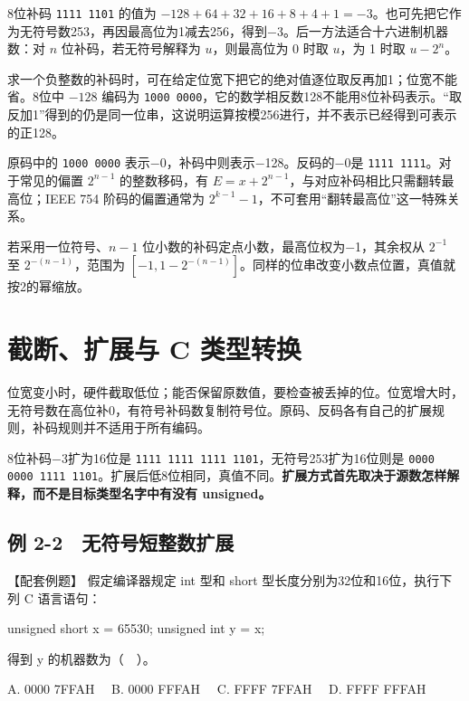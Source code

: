 8位补码 \texttt{1111 1101} 的值为 \(-128+64+32+16+8+4+1=-3\)。也可先把它作为无符号数253，再因最高位为1减去256，得到\ensuremath{-}3。后一方法适合十六进制机器数：对 \(n\) 位补码，若无符号解释为 \(u\)，则最高位为 0 时取 \(u\)，为 1 时取 \(u-2^n\)。

求一个负整数的补码时，可在给定位宽下把它的绝对值逐位取反再加1；位宽不能省。8位中 \(-128\) 编码为 \texttt{1000 0000}，它的数学相反数128不能用8位补码表示。``取反加1''得到的仍是同一位串，这说明运算按模256进行，并不表示已经得到可表示的正128。

原码中的 \texttt{1000 0000} 表示\ensuremath{-}0，补码中则表示\ensuremath{-}128。反码的\ensuremath{-}0是 \texttt{1111 1111}。对于常见的偏置 \(2^{n-1}\) 的整数移码，有 \(E=x+2^{n-1}\)，与对应补码相比只需翻转最高位；IEEE 754 阶码的偏置通常为 \(2^{k-1}-1\)，不可套用``翻转最高位''这一特殊关系。

若采用一位符号、\(n-1\) 位小数的补码定点小数，最高位权为\ensuremath{-}1，其余权从 \(2^{-1}\) 至 \(2^{-(n-1)}\)，范围为 \([-1,1-2^{-(n-1)}]\)。同样的位串改变小数点位置，真值就按2的幂缩放。

\section{截断、扩展与 C 类型转换}\label{CO02-05}

位宽变小时，硬件截取低位；能否保留原数值，要检查被丢掉的位。位宽增大时，无符号数在高位补0，有符号补码数复制符号位。原码、反码各有自己的扩展规则，补码规则并不适用于所有编码。

8位补码\ensuremath{-}3扩为16位是 \texttt{1111 1111 1111 1101}，无符号253扩为16位则是 \texttt{0000 0000 1111 1101}。扩展后低8位相同，真值不同。\textbf{扩展方式首先取决于源数怎样解释，而不是目标类型名字中有没有 unsigned。}

\subsection{例 2-2　无符号短整数扩展}\label{CO02-06}

\begin{example}[配套例题]

【配套例题】 假定编译器规定 int 型和 short 型长度分别为32位和16位，执行下列 C 语言语句：

\begin{codeblock}[language=C]
unsigned short x = 65530;
unsigned int y = x;
\end{codeblock}

得到 y 的机器数为（　）。

A. 0000 7FFAH　 B. 0000 FFFAH　 C. FFFF 7FFAH　 D. FFFF FFFAH

\end{example}


